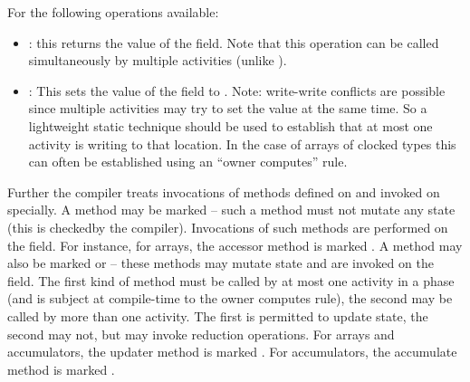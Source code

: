 For  the following operations available:
\begin{itemize}
\item {}: this returns the value of the  field. Note
  that this operation can be called simultaneously by multiple
  activities  (unlike ). 

\item {}: This sets the value of the  field to .
Note: write-write conflicts are possible since multiple activities may
try to set the value at the same time. So a lightweight static
technique should be used to establish that at most one activity is
writing to that location. In the case of arrays of clocked types this
can often be established using an ``owner computes'' rule.
\end{itemize}

Further the compiler treats invocations of methods defined on 
and invoked on  specially. A method may be marked
 -- such a method must not mutate any state (this is
checkedby the compiler). Invocations of such methods are performed on
the  field. For instance, for arrays, the accessor
method is marked .  A method may also be marked
 or  -- these methods may mutate state and
are invoked on the  field. The
first kind of method must be called by at most one activity in a phase
(and is subject at compile-time to the owner computes rule), the
second may be called by more than one activity. The first is permitted
to update state, the second may not, but may invoke reduction
operations. For arrays and accumulators, the updater method is marked
. For accumulators, the accumulate method is marked
.



